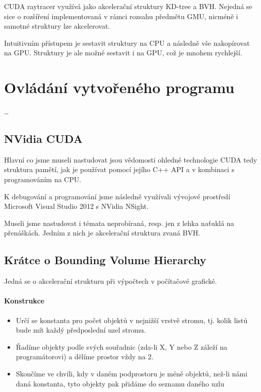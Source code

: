 \documentclass[12pt,a4paper,titlepage,final]{report}
\begin{document}
CUDA raytracer využívá jako akcelerační struktury KD-tree a BVH. Nejedná se sice o rozšíření implementovaná v rámci rozsahu předmětu GMU, nicméně i samotné struktury lze akcelerovat.

Intuitivním přístupem je sestavit struktury na CPU a následně vše nakopírovat na GPU. Struktury je ale možné sestavit i na GPU, což je mnohem rychlejší. \cite{karras}



\section{Ovládání vytvořeného programu}

\dots




\subsection{NVidia CUDA}
Hlavní co jsme museli nastudovat jsou vědomosti ohledně technologie CUDA tedy struktura pamětí, jak je používat pomocí jejího C++ API a v kombinaci s programováním na CPU.

K debugování a programování jsme následně využívali vývojové prostředí Microsoft Visual Studio 2012 s NVidia NSight.

Museli jsme nastudovat i témata neprobíraná, resp. jen z lehka naťuklá na přenáškách. Jedním z nich je akcelerační struktura zvaná BVH.

\subsection{Krátce o Bounding Volume Hierarchy}
Jedná se o akcelerační strukturu při výpočtech v počítačové grafické.

\paragraph{Konstrukce}
\begin{itemize}
	\item Určí se konstanta pro počet objektů v nejnižší vrstvě stromu, tj. kolik listů bude mít každý předposlední uzel stromu.
	\item Řadíme objekty podle svých souřadnic (zda-li X, Y nebo Z záleží na programátorovi) a dělíme prostor vždy na 2.
	\item Skončíme ve chvíli, kdy v daném podprostoru je méně objektů, než-li námi daná konstanta, tyto objekty pak přidáme do seznamu daného uzlu
\end{itemize}
\end{document}
